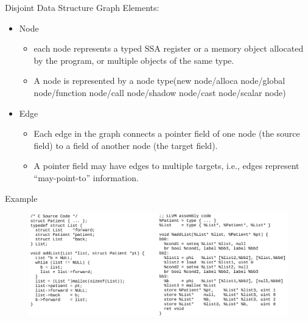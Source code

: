\documentclass{beamer}
\begin{document}
\begin{frame}{Disjoint Data Structure Graph}
  Elements:
  \begin{itemize}
	\item Node
	  \begin{itemize}
		\item each node represents a
typed SSA register or a memory object allocated by the program, or
multiple objects of the same type. 
\item A node is represented by a node
type(new node/alloca node/global node/function node/call node/shadow node/cast node/scalar node)
	  \end{itemize}
	\item Edge 
	  \begin{itemize}
\item 		Each edge in the graph connects a pointer field of one node
(the source field) to a field of another node (the target field).
\item 
	  A pointer field may have edges to multiple targets, i.e.,
edges represent “may-point-to” information.
	  \end{itemize}
  \end{itemize}
\end{frame}

\begin{frame}{Example}
  \begin{figure}[H]
	\centering
	\includegraphics[scale=0.25]{./fig/node.png}
  \end{figure}
\end{frame}
\end{document}
